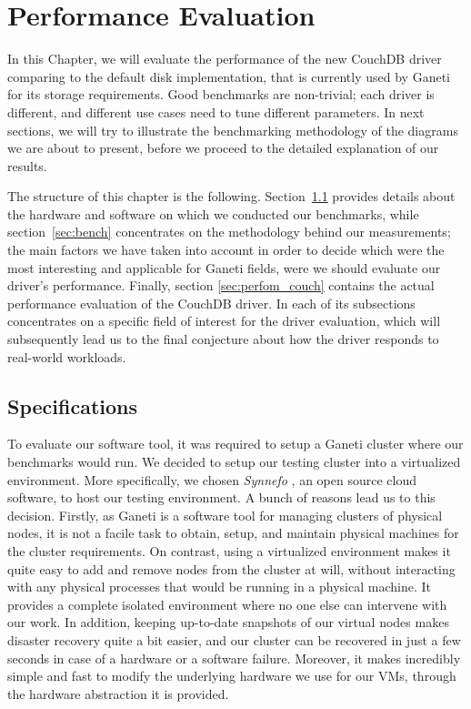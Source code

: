 \chapter{Performance Evaluation}\label{ch:performance}

In this Chapter, we will evaluate the performance of the new CouchDB driver
comparing to the default disk implementation, that is currently used by Ganeti
for its storage requirements. Good benchmarks are non-trivial; each driver is
different, and different use cases need to tune different parameters. In next
sections, we will try to illustrate the benchmarking methodology of the diagrams
we are about to present, before we proceed to the detailed explanation of our
results.

The structure of this chapter is the following. Section~\ref{sec:specs} provides
details about the hardware and software on which we conducted our benchmarks,
while section~\ref{sec:bench} concentrates on the methodology behind our
measurements; the main factors we have taken into account in order to
decide which were the most interesting and applicable for Ganeti fields, were we
should evaluate our driver's performance. Finally, section
\ref{sec:perfom_couch} contains the actual performance evaluation of the CouchDB
driver. In each of its subsections concentrates on a specific field of interest
for the driver evaluation, which will subsequently lead us to the final
conjecture about how the driver responds to real-world workloads.

\section{Specifications}\label{sec:specs}

To evaluate our software tool, it was required to setup a Ganeti
cluster where our benchmarks would run. We decided to setup our testing cluster
into a virtualized environment. More specifically, we chosen \emph{Synnefo}
, an open source cloud software, to host our
testing environment. A bunch of reasons lead us to this decision. Firstly, as
Ganeti is a software tool for managing clusters of physical nodes, it is not a
facile task to obtain, setup, and maintain physical machines for the cluster
requirements. On contrast, using a virtualized environment makes it quite easy
to add and remove nodes from the cluster at will, without interacting with any
physical processes that would be running in a physical machine. It
provides a complete isolated environment where no one else can intervene with
our work. In addition, keeping up-to-date snapshots of our virtual nodes makes
disaster recovery quite a bit easier, and our cluster can be recovered in just a
few seconds in case of a hardware or a software failure. Moreover, it makes
incredibly simple and fast to modify the underlying hardware we use for our VMs,
through the hardware abstraction it is provided.

